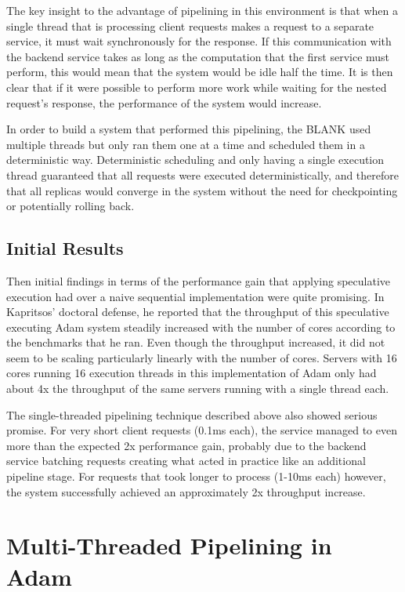 \documentclass[11pt, oneside]{report}
\begin{document}
The key insight to the advantage of pipelining in this environment is that when a single thread that is processing client requests makes a request to a separate service, it must wait synchronously for the response. If this communication with the backend service takes as long as the computation that the first service must perform, this would mean that the system would be idle half the time. It is then clear that if it were possible to perform more work while waiting for the nested request's response, the performance of the system would increase.

In order to build a system that performed this pipelining, the BLANK used multiple threads but only ran them one at a time and scheduled them in a deterministic way. Deterministic scheduling and only having a single execution thread guaranteed that all requests were executed deterministically, and therefore that all replicas would converge in the system without the need for checkpointing or potentially rolling back. 

\section{Initial Results}

Then initial findings in terms of the performance gain that applying speculative execution had over a naive sequential implementation were quite promising. In Kapritsos' doctoral defense, he reported that the throughput of this speculative executing Adam system steadily increased with the number of cores according to the benchmarks that he ran. Even though the throughput increased, it did not seem to be scaling particularly linearly with the number of cores. Servers with 16 cores running 16 execution threads in this implementation of Adam only had about 4x the throughput of the same servers running with a single thread each.

The single-threaded pipelining technique described above also showed serious promise. For very short client requests (0.1ms each), the service managed to even more than the expected 2x performance gain, probably due to the backend service batching requests creating what acted in practice like an additional pipeline stage. For requests that took longer to process (1-10ms each) however, the system successfully achieved an approximately 2x throughput increase.


\chapter{Multi-Threaded Pipelining in Adam}\label{AdamDesign}
\end{document}
